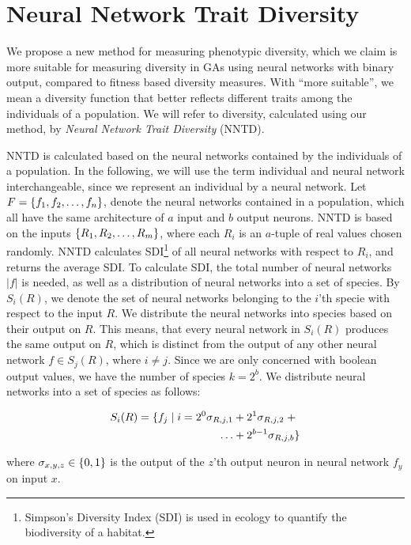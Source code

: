 \section{Neural Network Trait Diversity}
We propose a new method for measuring phenotypic diversity, which we claim is more suitable for measuring diversity in GAs using neural networks with binary output, compared to fitness based diversity measures. With ``more suitable'', we mean a diversity function that better reflects different traits among the individuals of a population. We will refer to diversity, calculated using our method, by \emph{Neural Network Trait Diversity} (NNTD).

NNTD is calculated based on the neural networks contained by the individuals of a population. 
In the following, we will use the term individual and neural network interchangeable, since we represent an individual by a neural network. 
Let $F = \{ f_1, f_2, \dots, f_n \}$, denote the neural networks contained in a population, which all have the same architecture of $a$ input and $b$ output neurons. 
NNTD is based on the inputs $\{ R_1, R_2, \dots, R_m \}$, where each $R_i$ is an $a$-tuple of real values chosen randomly.
NNTD calculates SDI\footnote{Simpson's Diversity Index (SDI) is used in ecology to quantify the biodiversity of a habitat.} of all neural networks with respect to $R_i$, and returns the average SDI.
To calculate SDI, the total number of neural networks $|f|$ is needed, as well as a distribution of neural networks into a set of species.
By $S_i(R)$, we denote the set of neural networks belonging to the $i$'th specie with respect to the input $R$.
We distribute the neural networks into species based on their output on $R$. This means, that every neural network in $S_i(R)$ produces the same output on $R$, which is distinct from the output of any other neural network $f \in S_j(R)$, where $i \neq j$.
Since we are only concerned with boolean output values, we have the number of species $k = 2^b$. 
We distribute neural networks into a set of species as follows:

\begin{equation}\label{eq:species}
  \begin{split}
    S_i(R) = \{ f_j \mid i = 2^0\sigma_{R,j,1} & + 2^1\sigma_{R,j,2}\; + \\
  \dots & + 2^{b-1}\sigma_{R,j,b} \}
  \end{split}
\end{equation}

where $\sigma_{x,y,z} \in \{ 0, 1 \}$ is the output of the $z$'th output neuron in neural network $f_y$ on input $x$.

